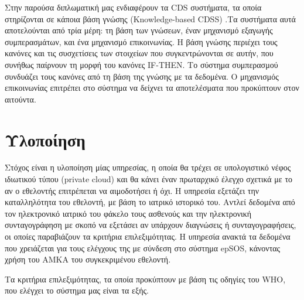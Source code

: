 		Στην παρούσα διπλωματική μας ενδιαφέρουν τα CDS συστήματα, τα οποία στηρίζονται σε κάποια βάση γνώσης (Knowledge-based CDSS) .Τα συστήματα αυτά αποτελούνται από τρία μέρη: τη βάση των γνώσεων, έναν μηχανισμό εξαγωγής συμπερασμάτων, και ένα μηχανισμό επικοινωνίας. Η βάση γνώσης περιέχει τους κανόνες και τις συσχετίσεις των στοιχείων που συγκεντρώνονται σε αυτήν, που συνήθως παίρνουν τη μορφή του κανόνες IF-THEN. Το σύστημα συμπερασμού συνδυάζει τους κανόνες από τη βάση της γνώσης με τα δεδομένα. Ο μηχανισμός επικοινωνίας επιτρέπει στο σύστημα να δείχνει τα αποτελέσματα που προκύπτουν στον αιτούντα.
		
\section{Υλοποίηση}


		Στόχος είναι η υλοποίηση μίας υπηρεσίας, η οποία θα τρέχει σε υπολογιστικό νέφος ιδιωτικού τύπου (private cloud) και θα κάνει έναν πρωταρχικό έλεγχο σχετικά με το αν ο εθελοντής επιτρέπεται να αιμοδοτήσει ή όχι. Η υπηρεσία εξετάζει την καταλληλότητα του εθελοντή, με βάση το ιατρικό ιστορικό του. Αντλεί δεδομένα από τον ηλεκτρονικό ιατρικό του φάκελο τους ασθενούς και την ηλεκτρονική συνταγογράφηση με σκοπό να εξετάσει αν υπάρχουν διαγνώσεις ή συνταγογραφήσεις, οι οποίες παραβιάζουν τα κριτήρια επιλεξιμότητας. Η υπηρεσία ανακτά τα δεδομένα που χρειάζεται για τους ελέγχους της με σύνδεση στο σύστημα epSOS, κάνοντας χρήση του ΑΜΚΑ του συγκεκριμένου εθελοντή.
		
		Τα κριτήρια επιλεξιμότητας, τα οποία προκύπτουν με βάση τις οδηγίες του WHO, \cite{safety} που ελέγχει το σύστημα μας είναι τα εξής.
		
